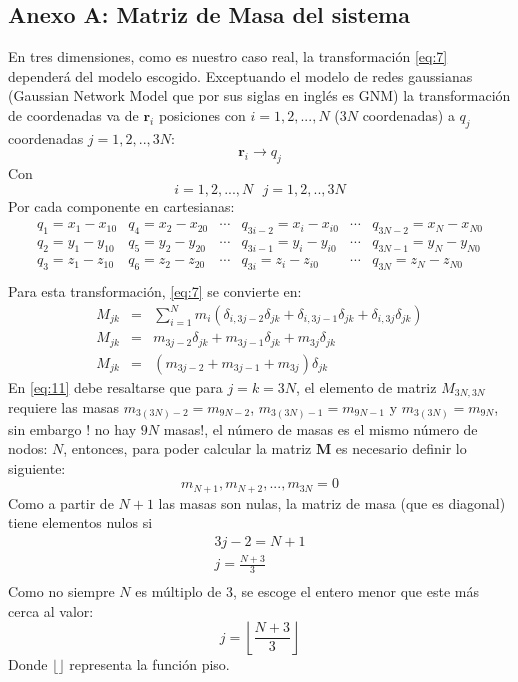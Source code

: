 \begin{appendix}
\chapter{Anexo A: Matriz de Masa del sistema }\label{AnexoA}
En tres dimensiones, como es nuestro caso real, la transformaci\'{o}n \eqref{eq:7} depender\'{a} del modelo escogido. Exceptuando el modelo de redes gaussianas (Gaussian Network Model que por sus siglas en ingl\'{e}s es GNM) la transformaci\'{o}n de coordenadas va de $\mathbf{r}_{i}$ posiciones con $i=1,2,...,N$ ($3N$ coordenadas) a $q_j$ coordenadas $j=1,2,..,3N$:
\begin{equation*}
\mathbf{r}_{i}\longrightarrow q_{j}
\end{equation*}
Con
\begin{equation*}
i=1,2,...,N\mbox{  }j=1,2,..,3N
\end{equation*}
Por cada componente en cartesianas:
\begin{eqnarray}\label{eq:10}
\begin{array}{cccccc}
q_1=x_1-x_{10}&q_4=x_2-x_{20}&\cdots &q_{3i-2}=x_i-x_{i0}&\cdots &q_{3N-2}=x_N-x_{N0} \\
q_2=y_1-y_{10}&q_5=y_2-y_{20}&\cdots &q_{3i-1}=y_i-y_{i0}&\cdots &q_{3N-1}=y_N-y_{N0}\\
q_3=z_1-z_{10}&q_6=z_2-z_{20}&\cdots &q_{3i}=z_i-z_{i0}&\cdots &q_{3N}=z_N-z_{N0}\\
\end{array}
\end{eqnarray}
Para esta transformaci\'{o}n, \eqref{eq:7} se convierte en:
\begin{eqnarray}\label{eq:11}
M_{jk}&=&\sum_{i=1}^{N} m_{i}\left( \delta_{i,3j-2}\delta_{jk}+\delta_{i,3j-1}\delta_{jk}+  \delta_{i,3j}\delta_{jk}\right)\nonumber \\
M_{jk}&=&m_{3j-2}\delta_{jk}+m_{3j-1}\delta_{jk}+m_{3j}\delta_{jk} \nonumber \\
M_{jk}&=&\left( m_{3j-2}+m_{3j-1}+m_{3j} \right) \delta_{jk}
\end{eqnarray}
En \eqref{eq:11} debe resaltarse que para $j=k=3N$, el elemento de matriz $M_{3N,3N}$ requiere las masas $m_{3(3N)-2}=m_{9N-2}$, $m_{3(3N)-1}=m_{9N-1}$ y $m_{3(3N)}=m_{9N}$, sin embargo ! no hay $9N$ masas!, el n\'{u}mero de masas es el mismo n\'{u}mero de nodos: $N$, entonces, para poder calcular la matriz $\mathbf{M}$ es necesario definir lo siguiente:
\begin{equation}\label{eq:12}
m_{N+1},m_{N+2},...,m_{3N}=0
\end{equation}
Como a partir de $N+1$ las masas son nulas, la matriz de masa (que es diagonal) tiene elementos nulos si  
\begin{eqnarray*}
3j-2=N+1\\
j=\frac{N+3}{3} \\
\end{eqnarray*}
Como no siempre $N$ es m\'{u}ltiplo de 3, se escoge el entero menor que este m\'{a}s cerca al valor:
\begin{equation}\label{eq:13}
j=\left \lfloor\frac{N+3}{3}\right \rfloor
\end{equation}
Donde $\lfloor \rfloor$ representa la funci\'{o}n piso.


\end{appendix}
